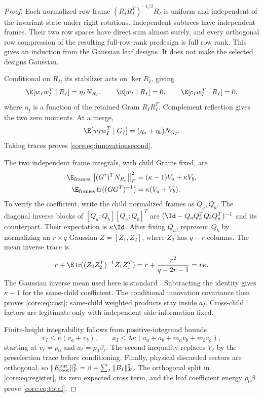 \documentclass[11pt,oneside,openany,a4paper]{book}
\numberwithin{equation}{chapter}
\theoremstyle{definition}
\theoremstyle{remark}
\newcommand{\F}[1]{\left\lVert#1\right\rVert_F}
\DeclareMathOperator{\tr}{tr}\DeclareMathOperator{\rank}{rank}
\begin{document}
\begin{proof}
Each normalized row frame $(R_IR_I^T)^{-1/2}R_I$ is uniform and independent of the invariant state under right rotations. Independent subtrees have independent frames. Their two row spaces have direct sum almost surely, and every orthogonal row compression of the resulting full-row-rank predesign is full row rank. This gives an induction from the Gaussian leaf designs. It does not make the selected designs Gaussian.

Conditional on $R_I$, its stabilizer acts on $\ker R_I$, giving
\[
 \E[w_Iw_I^T\mid R_I]=\eta_I N_{R_I},\qquad
 \E[w_I\mid R_I]=0,\qquad
 \E[c_Iw_I^T\mid R_I]=0,
\]
where $\eta_I$ is a function of the retained Gram $R_IR_I^T$. Complement reflection gives the two zero moments. At a merge,
\[
 \E[w_Iw_I^T\mid G_I]=(\eta_a+\eta_b)N_{G_I}.
\]
Taking traces proves \eqref{core:eq:innovationsecond}.

The two independent frame integrals, with child Grams fixed, are
\begin{align*}
 \E_{\rm frames}\F{(G^\dagger)^TN_{R_a}}^2&=(\kappa-1)V_a+\kappa V_b,\\
 \E_{\rm frames}\tr((GG^T)^{-1})&=\kappa(V_a+V_b).
\end{align*}
To verify the coefficient, write the child normalized frames as $Q_a,Q_b$. The diagonal inverse blocks of $[Q_a;Q_b][Q_a;Q_b]^T$ are $(\Id-Q_aQ_b^TQ_bQ_a^T)^{-1}$ and its counterpart. Their expectation is $\kappa\Id$. After fixing $Q_a$, represent $Q_b$ by normalizing an $r\times q$ Gaussian $Z=[Z_1,Z_2]$, where $Z_2$ has $q-r$ columns. The mean inverse trace is
\[
 r+\E\tr((Z_2Z_2^T)^{-1}Z_1Z_1^T)=r+\frac{r^2}{q-2r-1}=r\kappa.
\]
The Gaussian inverse mean used here is standard \cite{HMT}. Subtracting the identity gives $\kappa-1$ for the same-child coefficient. The conditional innovation covariance then proves \eqref{core:eq:cost}; same-child weighted products stay inside $a_I$. Cross-child factors are legitimate only with independent side information fixed.

Finite-height integrability follows from positive-integrand bounds
\[
 v_I\le\kappa(v_a+v_b),\qquad
 a_I\le\lambda\kappa(a_a+a_b+m_av_b+m_bv_a),
\]
starting at $v_\ell=\rho_0$ and $a_\ell=\rho_0\beta_\ell$. The second inequality replaces $V_I$ by the preselection trace before conditioning. Finally, physical discarded sectors are orthogonal, so $\|E_{\rm root}^{\rm out}\|_F^2=\beta+\sum_I\|B_I\|_F^2$. The orthogonal split in \eqref{core:eq:register}, its zero expected cross term, and the leaf coefficient energy $\rho_0\beta$ prove \eqref{core:eq:total}.
\end{proof}
\end{document}

